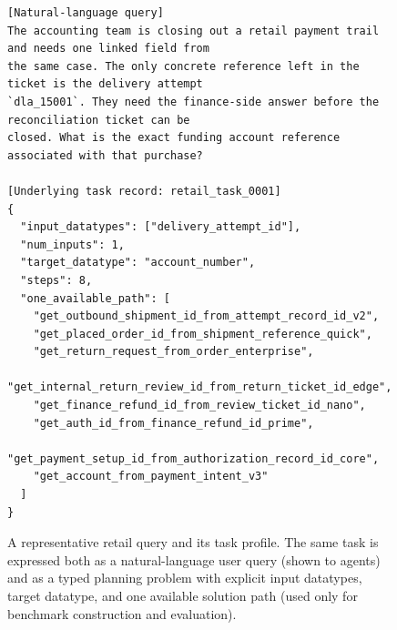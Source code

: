 \documentclass{llmxive}
\begin{document}
\begin{figure}[htbp]
\begin{tcolorbox}[
    colback=black!5!white,
    colframe=black,
    title=Data Case: Representative Query and Task Profile,
    fonttitle=\bfseries,
    colbacktitle=black!20!white,
    coltitle=black,
    boxrule=1.5pt,
    arc=5pt,
    boxsep=5pt,
    left=12pt,
    right=12pt,
    top=12pt,
    bottom=12pt
]
\begin{lstlisting}[basicstyle=\ttfamily\footnotesize,breaklines=true,columns=fullflexible,keepspaces=true]
[Natural-language query]
The accounting team is closing out a retail payment trail and needs one linked field from
the same case. The only concrete reference left in the ticket is the delivery attempt
`dla_15001`. They need the finance-side answer before the reconciliation ticket can be
closed. What is the exact funding account reference associated with that purchase?

[Underlying task record: retail_task_0001]
{
  "input_datatypes": ["delivery_attempt_id"],
  "num_inputs": 1,
  "target_datatype": "account_number",
  "steps": 8,
  "one_available_path": [
    "get_outbound_shipment_id_from_attempt_record_id_v2",
    "get_placed_order_id_from_shipment_reference_quick",
    "get_return_request_from_order_enterprise",
    "get_internal_return_review_id_from_return_ticket_id_edge",
    "get_finance_refund_id_from_review_ticket_id_nano",
    "get_auth_id_from_finance_refund_id_prime",
    "get_payment_setup_id_from_authorization_record_id_core",
    "get_account_from_payment_intent_v3"
  ]
}
\end{lstlisting}
\end{tcolorbox}
\caption{A representative retail query and its task profile. The same task is expressed both as a natural-language user query (shown to agents) and as a typed planning problem with explicit input datatypes, target datatype, and one available solution path (used only for benchmark construction and evaluation).}
\label{fig:case_data_query_profile}
\end{figure}
\end{document}
